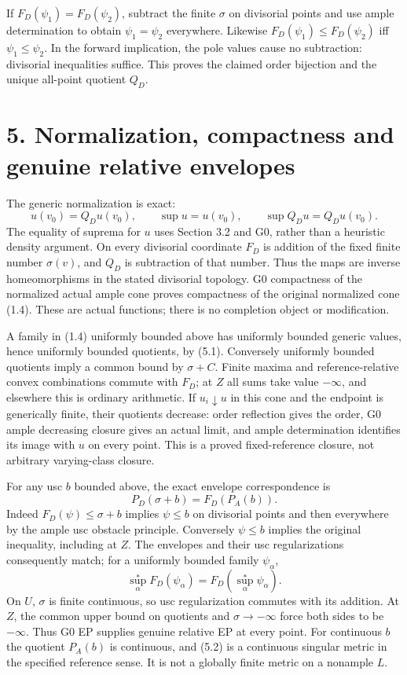 \documentclass[
  10pt,
]{article}
\begin{document}
If \(F_D(\psi_1)=F_D(\psi_2)\), subtract the finite \(\sigma\) on
divisorial points and use ample determination to obtain
\(\psi_1=\psi_2\) everywhere. Likewise \(F_D(\psi_1)\leq F_D(\psi_2)\)
iff \(\psi_1\leq\psi_2\). In the forward implication, the pole values
cause no subtraction: divisorial inequalities suffice. This proves the
claimed order bijection and the unique all-point quotient \(Q_D\).

\section{5. Normalization, compactness and genuine relative
envelopes}\label{normalization-compactness-and-genuine-relative-envelopes}

The generic normalization is exact:
\[u(v_0)=Q_Du(v_0),\qquad\sup u=u(v_0),\qquad\sup Q_Du=Q_Du(v_0).\tag{5.1}\]
The equality of suprema for \(u\) uses Section 3.2 and G0, rather than a
heuristic density argument. On every divisorial coordinate \(F_D\) is
addition of the fixed finite number \(\sigma(v)\), and \(Q_D\) is
subtraction of that number. Thus the maps are inverse homeomorphisms in
the stated divisorial topology. G0 compactness of the normalized actual
ample cone proves compactness of the original normalized cone (1.4).
These are actual functions; there is no completion object or
modification.

A family in (1.4) uniformly bounded above has uniformly bounded generic
values, hence uniformly bounded quotients, by (5.1). Conversely
uniformly bounded quotients imply a common bound by \(\sigma+C\). Finite
maxima and reference-relative convex combinations commute with \(F_D\);
at \(Z\) all sums take value \(-\infty\), and elsewhere this is ordinary
arithmetic. If \(u_i\downarrow u\) in this cone and the endpoint is
generically finite, their quotients decrease: order reflection gives the
order, G0 ample decreasing closure gives an actual limit, and ample
determination identifies its image with \(u\) on every point. This is a
proved fixed-reference closure, not arbitrary varying-class closure.

For any usc \(b\) bounded above, the exact envelope correspondence is
\[P_D(\sigma+b)=F_D(P_A(b)).\tag{5.2}\] Indeed \(F_D(\psi)\leq\sigma+b\)
implies \(\psi\leq b\) on divisorial points and then everywhere by the
ample usc obstacle principle. Conversely \(\psi\leq b\) implies the
original inequality, including at \(Z\). The envelopes and their usc
regularizations consequently match; for a uniformly bounded family
\(\psi_\alpha\),
\[\sup^*_\alpha F_D(\psi_\alpha)=F_D(\sup^*_\alpha\psi_\alpha).\tag{5.3}\]
On \(U\), \(\sigma\) is finite continuous, so usc regularization
commutes with its addition. At \(Z\), the common upper bound on
quotients and \(\sigma\to-\infty\) force both sides to be \(-\infty\).
Thus G0 EP supplies genuine relative EP at every point. For continuous
\(b\) the quotient \(P_A(b)\) is continuous, and (5.2) is a continuous
singular metric in the specified reference sense. It is not a globally
finite metric on a nonample \(L\).
\end{document}
